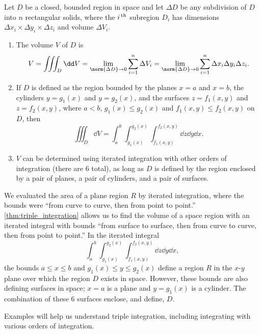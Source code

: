 {
\begin{theorem}\label{thm:triple_integration}%
Let $D$ be a closed, bounded region in space and let $\Delta D$ be any subdivision of $D$ into $n$ rectangular solids, where the  $i^\text{\,th}$ subregion $D_i$ has dimensions $\Delta x_i\times\Delta y_i\times\Delta z_i$ and volume $\Delta V_i$.
\begin{enumerate}
	\item	The volume $V$ of $D$ is
	\[V = \iiint_D\dd V = \lim_{\norm{\Delta D}\to0} \sum_{i=1}^n \Delta V_i = \lim_{\norm{\Delta D}\to0} \sum_{i=1}^n \Delta x_i\Delta y_i\Delta z_i.\]

	\item	If $D$ is defined as the region bounded by the planes $x=a$ and $x=b$, the cylinders $y=g_1(x)$ and $y=g_2(x)$, and the surfaces $z=f_1(x,y)$ and $z=f_2(x,y)$, where $a<b$, $g_1(x)\leq g_2(x)$ and $f_1(x,y)\leq f_2(x,y)$ on $D$, then
	\[\iiint_D \dd V = \int_a^b\int_{g_1(x)}^{g_2(x)}\int_{f_1(x,y)}^{f_2(x,y)} \dd z\dd y\dd x.\]

	\item	$V$ can be determined using iterated integration with other orders of integration (there are 6 total), as long as $D$ is defined by the region enclosed by a pair of planes, a pair of cylinders, and a pair of surfaces.
\end{enumerate}
\end{theorem}
}

We evaluated the area of a plane region $R$ by iterated integration, where the bounds were ``from curve to curve, then from point to point.'' \autoref{thm:triple_integration} allows us to find the volume of a space region with an iterated integral with bounds ``from surface to surface, then from curve to curve, then from point to point.'' In the iterated integral 
\[\int_a^b\int_{g_1(x)}^{g_2(x)}\int_{f_1(x,y)}^{f_2(x,y)} \dd z\dd y\dd x,\]
the bounds $a\leq x\leq b$ and $g_1(x)\leq y\leq g_2(x)$ define a region $R$ in the $x$-$y$ plane over which the region $D$ exists in space. However, these bounds are also defining surfaces in space; $x=a$ is a plane and $y=g_1(x)$ is a cylinder. The combination of these 6 surfaces enclose, and define, $D$.


Examples will help us understand triple integration, including integrating with various orders of integration.


